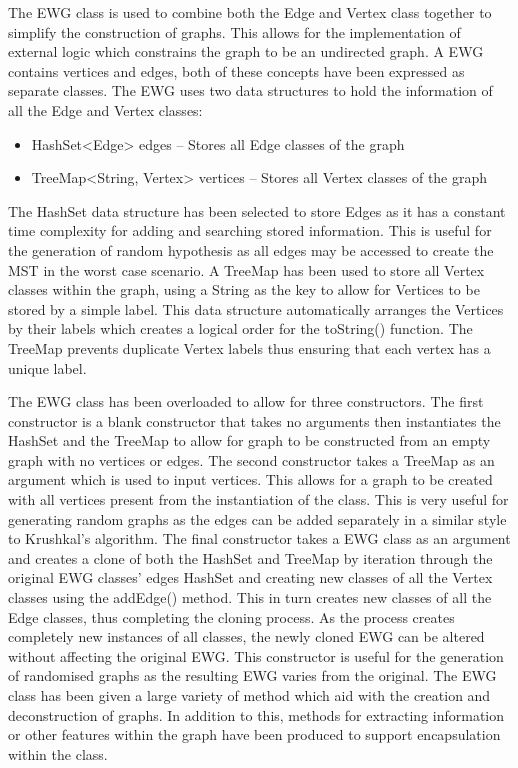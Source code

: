 \documentclass{AISB2008}
\begin{document}
The EWG class is used to combine both the Edge and Vertex class together to simplify the construction of graphs. This allows for the implementation of external logic which constrains the graph to be an undirected graph.
A EWG contains vertices and edges, both of these concepts have been expressed as separate classes. The EWG uses two data structures to hold the information of all the Edge and Vertex classes:

\begin{itemize}
\item HashSet<Edge> edges – Stores all Edge classes of the graph
\item TreeMap<String, Vertex> vertices – Stores all Vertex classes of the graph
\end{itemize}

The HashSet data structure has been selected to store Edges as it has a constant time complexity for adding and searching stored information. This is useful for the generation of random hypothesis as all edges may be accessed to create the MST in the worst case scenario.
A TreeMap has been used to store all Vertex classes within the graph, using a String as the key to allow for Vertices to be stored by a simple label. This data structure automatically arranges the Vertices by their labels which creates a logical order for the toString() function. The TreeMap prevents duplicate Vertex labels thus ensuring that each vertex has a unique label.

The EWG class has been overloaded to allow for three constructors. The first constructor is a blank constructor that takes no arguments then instantiates the HashSet and the TreeMap to allow for graph to be constructed from an empty graph with no vertices or edges. The second constructor takes a TreeMap as an argument which is used to input vertices. This allows for a graph to be created with all vertices present from the instantiation of the class. This is very useful for generating random graphs as the edges can be added separately in a similar style to Krushkal’s algorithm. The final constructor takes a EWG class as an argument and creates a clone of both the HashSet and TreeMap by iteration through the original EWG classes’ edges HashSet and creating new classes of all the Vertex classes using the addEdge() method. This in turn creates new classes of all the Edge classes, thus completing the cloning process. As the process creates completely new instances of all classes, the newly cloned EWG can be altered without affecting the original EWG. This constructor is useful for the generation of randomised graphs as the resulting EWG varies from the original.
The EWG class has been given a large variety of method which aid with the creation and deconstruction of graphs. In addition to this, methods for extracting information or other features within the graph have been produced to support encapsulation within the class.
\end{document}
